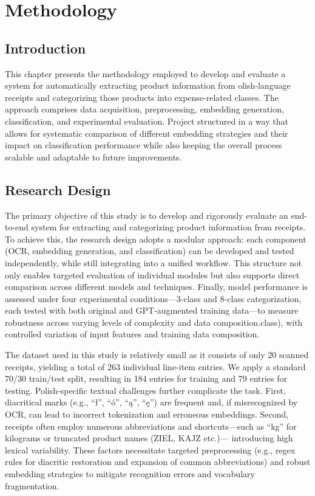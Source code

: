 \documentclass{SGGW-thesis-EN}
\begin{document}
\chapter{Methodology}


\section{Introduction}
This chapter presents the methodology employed to develop and evaluate a system for automatically extracting product information from 
olish-language receipts and categorizing those products into expense-related classes. 
The approach comprises data acquisition, preprocessing, embedding generation, classification, and experimental evaluation. 
Project structured in a way that allows for systematic comparison of different embedding strategies and their impact
 on classification performance while also keeping the overall process scalable and adaptable to future improvements.


\section{Research Design}
The primary objective of this study is to develop and rigorously evaluate an end-to-end system for extracting and categorizing product information from receipts. 
To achieve this, the research design adopts a modular approach: each component (OCR, embedding generation, and classification) can be developed and tested independently, 
while still integrating into a unified workflow. 
This structure not only enables targeted evaluation of individual modules but also supports direct comparison across different models and techniques. 
Finally, model performance is assessed under four experimental conditions—3-class and 8-class categorization, each tested with both original and GPT-augmented training data—to measure robustness across varying levels of complexity and data composition.class), 
 with controlled variation of input features and training data composition.

The dataset used in this study is relatively small as it consists of only 20 scanned receipts, yielding a total of 263 individual line‐item entries. 
We apply a standard 70/30 train/test split, resulting in 184 entries for training and 79 entries for testing.
Polish‐specific textual challenges further complicate the task. First, diacritical marks (e.g., “ł”, “ó”, “ą”, “ę”) are frequent and, 
if misrecognized by OCR, can lead to incorrect tokenization and erroneous embeddings. 
Second, receipts often employ numerous abbreviations and shortcuts—such as “kg” for kilograms or truncated product names (ZIEL, KAJZ etc.)—
introducing high lexical variability. These factors necessitate targeted preprocessing 
(e.g., regex rules for diacritic restoration and expansion of common abbreviations) and robust embedding strategies to mitigate recognition errors and vocabulary fragmentation.
\end{document}
